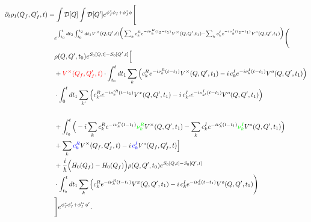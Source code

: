 \documentclass{article}
\begin{document}
\begin{align*}
\partial_t\rho_1(Q_f, Q_f', t) &= \int \mathcal{D}[Q] \int \mathcal{D}[Q'] 
e^{\phi_f^*\phi_f+\phi_f^*\phi}\Bigg[ \\
&\quad
e^{\int_{t_0}^t dt_2 \int_{t_0}^{t_2} dt_1 V^{\times}(Q, Q', t) \Big(
\sum_k c_k^R e^{-i \nu_k^R (t_2 - t_1)} V^{\times}(Q, Q', t_1)
- \sum_k c_k^I e^{-i \nu_k^I (t_2 - t_1)} V^o(Q, Q', t_1) \Big)} \Bigg( \\
&\quad 
\rho(Q, Q', t_0)e^{S_0[Q,t]-S_0[Q',t]} \Big[\\
&\quad 
+\textcolor{red}{V^{\times}(Q_f, Q_f', t)} \cdot \int_{t_0}^t dt_1 \sum_k \Big(
c_k^R e^{-i \nu_k^R (t - t_1)} V^{\times}(Q, Q', t_1)
- i \, c_k^I e^{-i \nu_k^I (t - t_1)} V^o(Q, Q', t_1)
\Big) \\
&\quad 
\cdot \int_0^t dt_1 \sum_{k'} 
\Big(
c_{k'}^R e^{-i \nu_k'^R (t - t_1)} V^x(Q, Q', t_1)
- i \, c_{k'}^I e^{-i \nu_{k'}^I (t - t_1)} V^o(Q, Q', t_1)
\Big) \\
&\quad \\
&\quad + \int_{t_0}^t 
\Big(
- i \sum_k c_k^R e^{-i \nu_k^R (t - t_1)} \textcolor{green}{\nu_k^R } V^{\times}(Q, Q', t_1)
- \sum_k c_k^I e^{-i \nu_k^I (t - t_1)} \textcolor{green}{\nu_k^I} V^o(Q, Q', t_1)
\Big) \\
&\quad + 
\sum_k \textcolor{blue}{c_k^R} V^{\times}(Q_f, Q_f', t) - i \, \textcolor{blue}{c_k^I} V^o(Q_f, Q_f', t) \Big] \\
&\quad+ 
\frac{i}{\hbar} \Big(H_0(Q_f) - H_0(Q_f)\Big)\rho(Q, Q', t_0)e^{S_0[Q,t]-S_0[Q',t]} \\
&\quad 
\cdot \int_{t_0}^t dt_1 \sum_k 
\Big(
c_k^R e^{-i \nu_k^R (t - t_1)} V^x(Q, Q', t_1)
- i \, c_k^I e^{-i \nu_k^I (t - t_1)} V^o(Q, Q', t_1)\Bigg)\\
&\quad
\Bigg] e^{\phi_f^*\phi'_f+\phi_f'^*\phi'} .
\end{align*}
\end{document}
